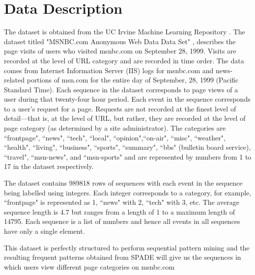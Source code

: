 \section{Data Description}

The dataset is obtained from the UC Irvine Machine Learning Repository \cite{b2}. The dataset titled "MSNBC.com Anonymous Web Data Data Set" \cite{b2}, describes the page visits of users who visited msnbc.com on September 28, 1999. Visits are recorded at the level of URL category and are recorded in time order. The data comes from Internet Information Server (IIS) logs for msnbc.com and news-related portions of msn.com for the entire day of September, 28, 1999 (Pacific Standard Time). Each sequence in the dataset corresponds to page views of a user during that twenty-four hour period. Each event in the sequence corresponds to a user's request for a page. Requests are not recorded at the finest level of detail---that is, at the level of URL, but rather, they are recorded at the level of page category (as determined by a site administrator). The categories are ``frontpage", ``news", ``tech", ``local", ``opinion",``on-air", ``misc", ``weather", ``health", ``living", ``business", ``sports", ``summary", ``bbs" (bulletin board service), ``travel", ``msn-news", and ``msn-sports" and are represented by numbers from 1 to 17 in the dataset respectively.

The dataset contains 989818 rows of sequences with each event in the sequence being labelled using integers. Each integer corresponds to a category, for example, ``frontpage" is represented as 1, ``news" with 2, ``tech" with 3, etc. The average sequence length is 4.7 but ranges from a length of 1 to a maximum length of 14795. Each sequence is a list of numbers and hence all events in all sequences have only a single element.

This dataset is perfectly structured to perform sequential pattern mining and the resulting frequent patterns obtained from SPADE will give us the sequences in which users view different page categories on msnbc.com